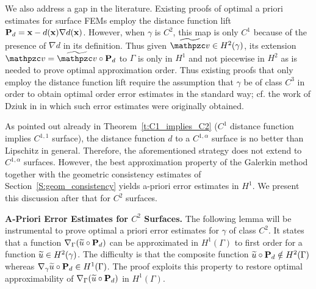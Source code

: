 We also address a gap in the literature.  Existing proofs of optimal a priori estimates for surface FEMs employ the distance function lift ${\bf P}_d={\bf x}-d({\bf x}) \nabla d({\bf x})$.  However, when $\gamma$ is $C^2$, this map is only $C^1$ because of the presence of $\nabla d$ in its definition.  Thus given $\wv \in H^2(\gamma)$, its extension $\tv = \wv \circ \bP_d$ to $\Gamma$ is only in $H^1$ and not piecewise in $H^2$ as is needed to prove optimal approximation order.  Thus existing proofs that only employ the distance function lift require the assumption that $\gamma$ be of class $C^3$ in order to obtain optimal order error estimates in the standard way; cf. the work of Dziuk in \cite{Dz88} in which such error estimates were originally obtained.   

As pointed out already in Theorem~\ref{t:C1_implies_C2} ($C^1$ distance function implies $C^{1,1}$ surface), the distance function $d$ to a $C^{1,\alpha}$ surface is no better than Lipschitz in general. Therefore, the aforementioned strategy does not extend to
$C^{1,\alpha}$ surfaces. 
However, the best approximation property of the Galerkin method together with the geometric consistency estimates of Section~\ref{S:geom_consistency} yields a-priori error estimates in $H^1$. We present this discussion after that for $C^2$ surfaces.

\medskip\noindent
{\bf A-Priori Error Estimates for $C^2$ Surfaces.}
The following lemma will be instrumental to prove optimal a priori error estimates for $\gamma$ of class $C^2$. It states that a function
$\nabla_\Gamma(\widetilde{u}\circ{\bf P}_d)$ can be approximated in $H^1(\Gamma)$ to first order
for a function $\widetilde{u}\in H^2(\gamma)$. The
difficulty is that the composite function $\widetilde{u}\circ{\bf P}_d\notin H^2(\Gamma)$
whereas $\nabla_\gamma \widetilde{u} \circ{\bf P}_d \in H^1(\Gamma)$. The proof exploits this property
to restore optimal approximability of $\nabla_\Gamma(\widetilde{u}\circ{\bf P}_d)$ in $H^1(\Gamma)$.

